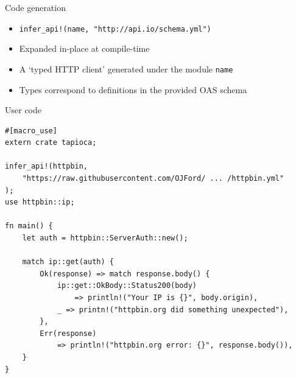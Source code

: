 \documentclass[10pt]{beamer}
\begin{document}
\begin{frame}{Code generation}

    \begin{itemize}[<+->]
        \item \texttt{infer_api!(name, "http://api.io/schema.yml")}
        \item Expanded in-place at compile-time
        \item A `typed HTTP client' generated under the module \texttt{name}
        \item Types correspond to definitions in the provided OAS schema
    \end{itemize}

\end{frame}

\begin{frame}[fragile]{User code}

    \begin{verbatim}
#[macro_use]
extern crate tapioca;

infer_api!(httpbin,
    "https://raw.githubusercontent.com/OJFord/ ... /httpbin.yml"
);
use httpbin::ip;

fn main() {
    let auth = httpbin::ServerAuth::new();

    match ip::get(auth) {
        Ok(response) => match response.body() {
            ip::get::OkBody::Status200(body)
                => println!("Your IP is {}", body.origin),
            _ => printn!("httpbin.org did something unexpected"),
        },
        Err(response)
            => println!("httpbin.org error: {}", response.body()),
    }
}
    \end{verbatim}

\end{frame}
\end{document}
